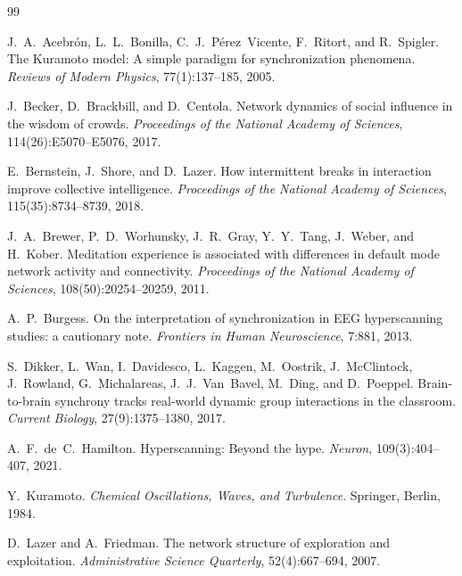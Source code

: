 \documentclass[11pt]{article}
\begin{document}
\begin{thebibliography}{99}

J.~A.~Acebr{\'o}n, L.~L.~Bonilla, C.~J.~P{\'e}rez~Vicente, F.~Ritort, and R.~Spigler.
\newblock The Kuramoto model: A simple paradigm for synchronization phenomena.
\newblock \emph{Reviews of Modern Physics}, 77(1):137--185, 2005.

J.~Becker, D.~Brackbill, and D.~Centola.
\newblock Network dynamics of social influence in the wisdom of crowds.
\newblock \emph{Proceedings of the National Academy of Sciences}, 114(26):E5070--E5076, 2017.

E.~Bernstein, J.~Shore, and D.~Lazer.
\newblock How intermittent breaks in interaction improve collective intelligence.
\newblock \emph{Proceedings of the National Academy of Sciences}, 115(35):8734--8739, 2018.

J.~A.~Brewer, P.~D.~Worhunsky, J.~R.~Gray, Y.~Y.~Tang, J.~Weber, and H.~Kober.
\newblock Meditation experience is associated with differences in default mode network activity and connectivity.
\newblock \emph{Proceedings of the National Academy of Sciences}, 108(50):20254--20259, 2011.

A.~P.~Burgess.
\newblock On the interpretation of synchronization in EEG hyperscanning studies: a cautionary note.
\newblock \emph{Frontiers in Human Neuroscience}, 7:881, 2013.

S.~Dikker, L.~Wan, I.~Davidesco, L.~Kaggen, M.~Oostrik, J.~McClintock, J.~Rowland, G.~Michalareas, J.~J.~Van~Bavel, M.~Ding, and D.~Poeppel.
\newblock Brain-to-brain synchrony tracks real-world dynamic group interactions in the classroom.
\newblock \emph{Current Biology}, 27(9):1375--1380, 2017.

A.~F.~de~C.~Hamilton.
\newblock Hyperscanning: Beyond the hype.
\newblock \emph{Neuron}, 109(3):404--407, 2021.

Y.~Kuramoto.
\newblock \emph{Chemical Oscillations, Waves, and Turbulence}.
\newblock Springer, Berlin, 1984.

D.~Lazer and A.~Friedman.
\newblock The network structure of exploration and exploitation.
\newblock \emph{Administrative Science Quarterly}, 52(4):667--694, 2007.


\end{thebibliography}
\end{document}
